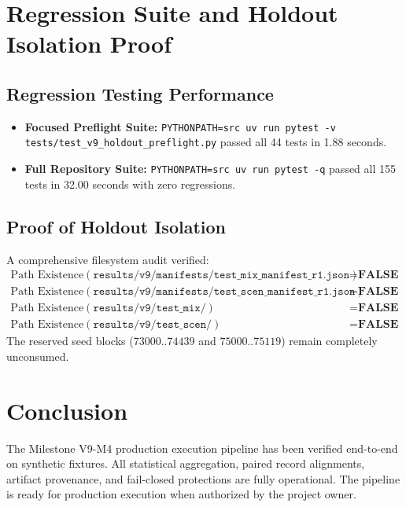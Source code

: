 \documentclass[10pt,a4paper]{article}
\begin{document}
\section{Regression Suite and Holdout Isolation Proof}

\subsection{Regression Testing Performance}
\begin{itemize}
    \item \textbf{Focused Preflight Suite:} \texttt{PYTHONPATH=src uv run pytest -v tests/test\_v9\_holdout\_preflight.py} passed all 44 tests in 1.88 seconds.
    \item \textbf{Full Repository Suite:} \texttt{PYTHONPATH=src uv run pytest -q} passed all 155 tests in 32.00 seconds with zero regressions.
\end{itemize}

\subsection{Proof of Holdout Isolation}
A comprehensive filesystem audit verified:
\begin{equation}
\begin{aligned}
    \text{Path Existence}(\texttt{results/v9/manifests/test\_mix\_manifest\_r1.json}) &= \textbf{FALSE} \\
    \text{Path Existence}(\texttt{results/v9/manifests/test\_scen\_manifest\_r1.json}) &= \textbf{FALSE} \\
    \text{Path Existence}(\texttt{results/v9/test\_mix/}) &= \textbf{FALSE} \\
    \text{Path Existence}(\texttt{results/v9/test\_scen/}) &= \textbf{FALSE}
\end{aligned}
\end{equation}
The reserved seed blocks ($73000..74439$ and $75000..75119$) remain completely unconsumed.

\section{Conclusion}
The Milestone V9-M4 production execution pipeline has been verified end-to-end on synthetic fixtures. All statistical aggregation, paired record alignments, artifact provenance, and fail-closed protections are fully operational. The pipeline is ready for production execution when authorized by the project owner.
\end{document}
